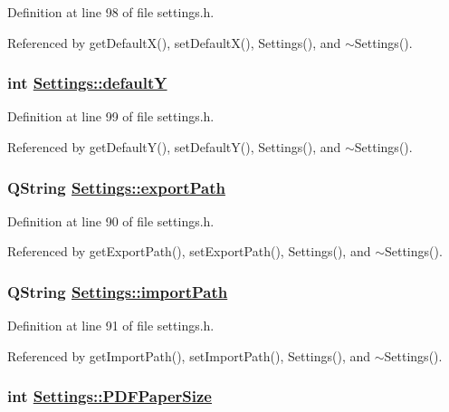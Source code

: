 Definition at line 98 of file settings.h.

Referenced by get\-Default\-X(), set\-Default\-X(), Settings(), and $\sim$Settings().\hypertarget{classSettings_r8}{
\subsubsection[defaultY]{\setlength{\rightskip}{0pt plus 5cm}int \hyperlink{classSettings_r8}{Settings::default\-Y}}}
\label{classSettings_r8}


Definition at line 99 of file settings.h.

Referenced by get\-Default\-Y(), set\-Default\-Y(), Settings(), and $\sim$Settings().\hypertarget{classSettings_r1}{
\subsubsection[exportPath]{\setlength{\rightskip}{0pt plus 5cm}QString \hyperlink{classSettings_r1}{Settings::export\-Path}}}
\label{classSettings_r1}


Definition at line 90 of file settings.h.

Referenced by get\-Export\-Path(), set\-Export\-Path(), Settings(), and $\sim$Settings().\hypertarget{classSettings_r2}{
\subsubsection[importPath]{\setlength{\rightskip}{0pt plus 5cm}QString \hyperlink{classSettings_r2}{Settings::import\-Path}}}
\label{classSettings_r2}


Definition at line 91 of file settings.h.

Referenced by get\-Import\-Path(), set\-Import\-Path(), Settings(), and $\sim$Settings().\hypertarget{classSettings_r18}{
\subsubsection[PDFPaperSize]{\setlength{\rightskip}{0pt plus 5cm}int \hyperlink{classSettings_r18}{Settings::PDFPaper\-Size}}}
\label{classSettings_r18}


